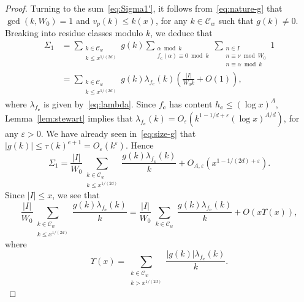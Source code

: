 \documentclass[10pt,a4paper]{amsart}
\renewcommand{\c}{\mathbf{c}}
\renewcommand{\leq}{\leqslant}
\newcommand{\ve}{\varepsilon}
\begin{document}
\begin{proof}
Turning to the sum~\eqref{eq:Sigma1'}, 
it follows from~\eqref{eq:nature-g} that 
 $\gcd(k,W_0)=1$ 
and $v_p(k)\leq k(x)$, 
for any $k\in \mathcal{C}_w$ such that $g(k)\neq 0$. 
 Breaking into residue classes modulo $k$, we deduce that 
\begin{align*}
\Sigma_1
&=
\sum_{\substack{k\in \mathcal{C}_w\\ k\leq x^{1/(2d)}}} g(k) 	
\sum_{\substack{\alpha \bmod{k}\\ f_\c(\alpha)\equiv 0 \bmod{k}}}
\sum_{\substack{n\in I
\\ n\equiv \nu\bmod{W_0}\\
n\equiv \alpha\bmod{k}}}1\\
&=
\sum_{\substack{k\in \mathcal{C}_w\\ k\leq x^{1/(2d)}}} g(k) 	
\lambda_{f_\c}(k)
\left(\frac{|I|}{W_0k} +O(1)\right),
\end{align*}
where $\lambda_{f_\c}$ is given by~\eqref{eq:lambda}.
Since $f_\c$ has content  $h_\c\leq (\log x)^A$, 
 Lemma~\ref{lem:stewart} implies that $\lambda_{f_\c}(k)=O_\ve(k^{1-1/d+\ve}(\log x)^{A/d})$, for any $\ve>0$.
We have already seen in~\eqref{eq:size-g} that  $|g(k)|\leq \tau(k)^{e+1}=O_\ve(k^{\ve})$.
Hence
\begin{equation}\label{eq:Sigma1''}
\Sigma_1
=
\frac{|I|}{W_0}
\sum_{\substack{k\in \mathcal{C}_w\\ k\leq x^{1/(2d)}}} \frac{g(k) 	
\lambda_{f_\c}(k)}{k}
+O_{A,\ve}\left(x^{1-1/(2d)+\ve}\right).
\end{equation}
Since $|I|\leq x$, we see that 
$$
\frac{|I|}{W_0}
\sum_{\substack{k\in \mathcal{C}_w\\ k\leq x^{1/(2d)}}} \frac{g(k) 	
\lambda_{f_\c}(k)}{k}=
\frac{|I|}{W_0}
\sum_{\substack{k\in \mathcal{C}_w}} \frac{g(k) 	
\lambda_{f_\c}(k)}{k}+O\left( x\Upsilon(x)\right),
$$
where
\begin{equation}\label{eq:robin}
\Upsilon(x)=\sum_{\substack{k\in \mathcal{C}_w\\  k> x^{1/(2d)}}}  
 \frac{|g(k)| 
\lambda_{f_\c}(k)}{k}.
\end{equation}


\end{proof}
\end{document}
